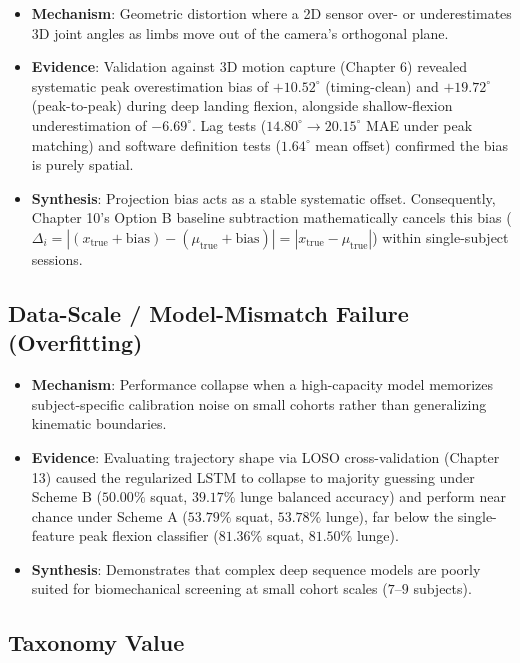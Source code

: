 \begin{itemize}
  \item \textbf{Mechanism}: Geometric distortion where a 2D sensor over- or underestimates 3D joint angles as limbs move out of the camera's orthogonal plane.
  \item \textbf{Evidence}: Validation against 3D motion capture (Chapter 6) revealed systematic peak overestimation bias of \textbf{$+10.52^\circ$} (timing-clean) and \textbf{$+19.72^\circ$} (peak-to-peak) during deep landing flexion, alongside shallow-flexion underestimation of \textbf{$-6.69^\circ$}. Lag tests ($14.80^\circ \rightarrow 20.15^\circ$ MAE under peak matching) and software definition tests ($1.64^\circ$ mean offset) confirmed the bias is purely spatial.
  \item \textbf{Synthesis}: Projection bias acts as a stable systematic offset. Consequently, Chapter 10's Option B baseline subtraction mathematically cancels this bias ($\Delta_i = |(x_{\text{true}} + \text{bias}) - (\mu_{\text{true}} + \text{bias})| = |x_{\text{true}} - \mu_{\text{true}}|$) within single-subject sessions.
\end{itemize}

\subsection{Data-Scale / Model-Mismatch Failure (Overfitting)}
\label{sec:14-2-4-data-scale-model-mismatch-failure-overfitting}

\begin{itemize}
  \item \textbf{Mechanism}: Performance collapse when a high-capacity model memorizes subject-specific calibration noise on small cohorts rather than generalizing kinematic boundaries.
  \item \textbf{Evidence}: Evaluating trajectory shape via LOSO cross-validation (Chapter 13) caused the regularized LSTM to collapse to majority guessing under Scheme B ($50.00\%$ squat, $39.17\%$ lunge balanced accuracy) and perform near chance under Scheme A ($53.79\%$ squat, $53.78\%$ lunge), far below the single-feature peak flexion classifier ($81.36\%$ squat, $81.50\%$ lunge).
  \item \textbf{Synthesis}: Demonstrates that complex deep sequence models are poorly suited for biomechanical screening at small cohort scales ($7\text{--}9$ subjects).
\end{itemize}

\subsection{Taxonomy Value}
\label{sec:14-2-5-taxonomy-value}

